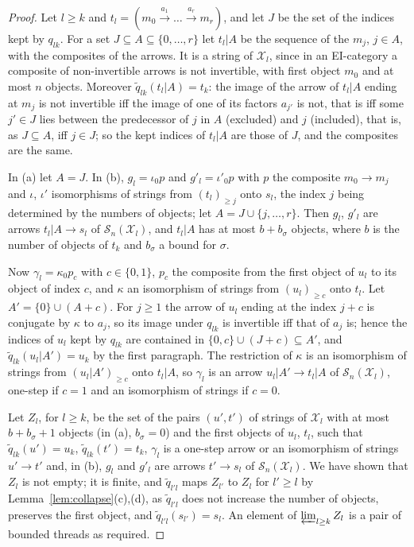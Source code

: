 \documentclass[11pt]{amsart}
\theoremstyle{definition}
\newcommand{\cX}{\mathcal X}
\newcommand{\cS}{\mathcal S}
\begin{document}
\begin{proof}
Let $l\ge k$ and $t_l=(m_0\xrightarrow{a_1}\dots\xrightarrow{a_r}
m_r)$, and let $J$ be the set of the indices kept by $q_{lk}$. For a
set $J\subseteq A\subseteq\{0,\dots,r\}$ let $t_l|A$ be the sequence
of the $m_j$, $j\in A$, with the composites of the arrows. It is a
string of $\cX_l$, since in an EI-category a composite of
non-invertible arrows is not invertible, with first object $m_0$ and
at most $n$ objects. Moreover $\tilde q_{lk}(t_l|A)=t_k$: the image
of the arrow of $t_l|A$ ending at $m_j$ is not invertible iff the
image of one of its factors $a_{j'}$ is not, that is iff some $j'\in
J$ lies between the predecessor of $j$ in $A$ (excluded) and $j$
(included), that is, as $J\subseteq A$, iff $j\in J$; so the kept
indices of $t_l|A$ are those of $J$, and the composites are the same.

In (a) let $A=J$. In (b), $g_l=\iota_0p$ and $g'_l=\iota'_0p$ with
$p$ the composite $m_0\to m_j$ and $\iota$, $\iota'$ isomorphisms of
strings from $(t_l)_{\ge j}$ onto $s_l$, the index $j$ being
determined by the numbers of objects; let $A=J\cup\{j,\dots,r\}$.
Then $g_l$, $g'_l$ are arrows $t_l|A\to s_l$ of $\cS_n(\cX_l)$, and
$t_l|A$ has at most $b+b_\sigma$ objects, where $b$ is the number of
objects of $t_k$ and $b_\sigma$ a bound for $\sigma$.

Now $\gamma_l=\kappa_0p_c$ with $c\in\{0,1\}$, $p_c$ the composite
from the first object of $u_l$ to its object of index $c$, and
$\kappa$ an isomorphism of strings from $(u_l)_{\ge c}$ onto $t_l$.
Let $A'=\{0\}\cup(A+c)$. For $j\ge1$ the arrow of $u_l$ ending at the
index $j+c$ is conjugate by $\kappa$ to $a_j$, so its image under
$q_{lk}$ is invertible iff that of $a_j$ is; hence the indices of
$u_l$ kept by $q_{lk}$ are contained in $\{0,c\}\cup(J+c)\subseteq
A'$, and $\tilde q_{lk}(u_l|A')=u_k$ by the first paragraph. The
restriction of $\kappa$ is an isomorphism of strings from $(u_l|A')_{
\ge c}$ onto $t_l|A$, so $\gamma_l$ is an arrow $u_l|A'\to t_l|A$ of
$\cS_n(\cX_l)$, one-step if $c=1$ and an isomorphism of strings if
$c=0$.

Let $Z_l$, for $l\ge k$, be the set of the pairs $(u',t')$ of strings
of $\cX_l$ with at most $b+b_\sigma+1$ objects (in (a), $b_\sigma=0$)
and the first objects of $u_l$, $t_l$, such that $\tilde q_{lk}(u')=
u_k$, $\tilde q_{lk}(t')=t_k$, $\gamma_l$ is a one-step arrow or an
isomorphism of strings $u'\to t'$ and, in (b), $g_l$ and $g'_l$ are
arrows $t'\to s_l$ of $\cS_n(\cX_l)$. We have shown that $Z_l$ is not
empty; it is finite, and $\tilde q_{l'l}$ maps $Z_{l'}$ to $Z_l$ for
$l'\ge l$ by Lemma~\ref{lem:collapse}(c),(d), as $\tilde q_{l'l}$ does not increase
the number of objects, preserves the first object, and $\tilde
q_{l'l}(s_{l'})=s_l$. An element of $\varprojlim_{l\ge k}Z_l$ is a
pair of bounded threads as required.
\end{proof}
\end{document}

